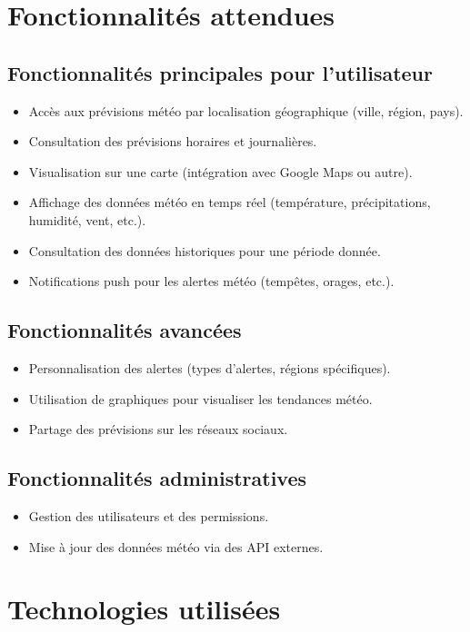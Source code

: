 \documentclass[a4paper,12pt]{article}
\begin{document}
\section{Fonctionnalités attendues}
\subsection{Fonctionnalités principales pour l'utilisateur}
\begin{itemize}
    \item Accès aux prévisions météo par localisation géographique (ville, région, pays).
    \item Consultation des prévisions horaires et journalières.
    \item Visualisation sur une carte (intégration avec Google Maps ou autre).
    \item Affichage des données météo en temps réel (température, précipitations, humidité, vent, etc.).
    \item Consultation des données historiques pour une période donnée.
    \item Notifications push pour les alertes météo (tempêtes, orages, etc.).
\end{itemize}

\subsection{Fonctionnalités avancées}
\begin{itemize}
    \item Personnalisation des alertes (types d’alertes, régions spécifiques).
    \item Utilisation de graphiques pour visualiser les tendances météo.
    \item Partage des prévisions sur les réseaux sociaux.
\end{itemize}

\subsection{Fonctionnalités administratives}
\begin{itemize}
    \item Gestion des utilisateurs et des permissions.
    \item Mise à jour des données météo via des API externes.
\end{itemize}

\section{Technologies utilisées}
\end{document}
